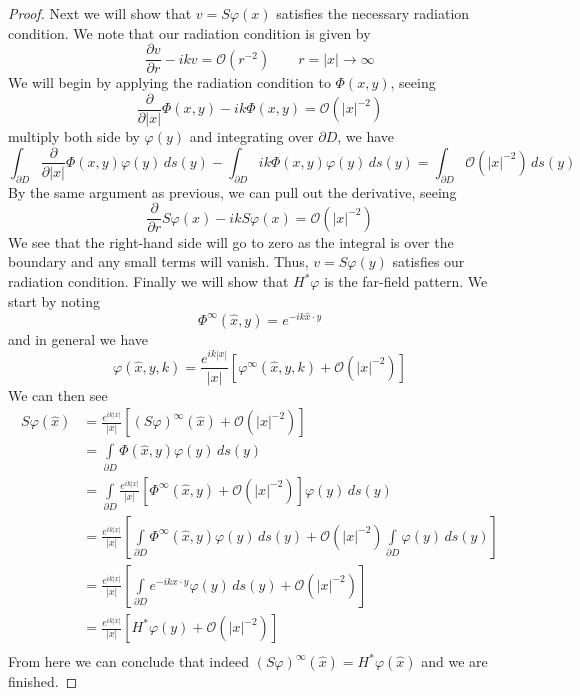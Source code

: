 \documentclass[]{article}
\begin{document}
\begin{proof}
				Next we will show that $v = S\varphi(x)$ satisfies the necessary radiation condition. We note that our radiation condition is given by
				\begin{equation}
					\frac{\partial v}{\partial r} - ikv = \mathcal O(r^{-2}) \qquad r = |x| \to \infty
				\end{equation}
				We will begin by applying the radiation condition to $\Phi (x, y)$, seeing
				\begin{equation}
					\frac{\partial}{\partial |x|}\Phi (x, y) - ik \Phi (x, y) = \mathcal O(|x|^{-2})
				\end{equation}
				multiply both side by $\varphi(y)$ and integrating over $\partial D$, we have
				\begin{equation}
					\int_{\partial D}\frac{\partial}{\partial |x|}\Phi (x, y)\varphi(y)\, ds(y) - \int_{\partial D}ik \Phi (x, y)\varphi(y)\, ds(y) = \int_{\partial D}\mathcal O(|x|^{-2})\, ds(y)
				\end{equation}
				By the same argument as previous, we can pull out the derivative, seeing
				\begin{equation}
					\frac{\partial}{\partial r}S\varphi(x) - ikS\varphi(x) = \mathcal O(|x|^{-2})
				\end{equation}
				We see that the right-hand side will go to zero as the integral is over the boundary and any small terms will vanish. Thus, $v= S\varphi(y)$ satisfies our radiation condition.
				Finally we will show that $H^\ast \varphi$ is the far-field pattern. We start by noting
				\begin{equation}
					\Phi^\infty(\hat x, y) = e^{-ik\hat x\cdot y}
				\end{equation}
				and in general we have
				\begin{equation}
					\varphi(\hat x, y, k) = \frac{e^{ik|x|}}{|x|}\left[ \varphi^\infty(\hat x, y, k) + \mathcal O(|x|^{-2})\right] 
				\end{equation}
				We can then see
				\begin{align}
					S\varphi(\hat x) &= \frac{e^{ik|x|}}{|x|}\left[ (S\varphi)^\infty(\hat x) + \mathcal O(|x|^{-2})\right] \\
					&= \int\limits_{\partial D} \Phi(\hat x, y)\varphi(y)\, ds(y)\\
					&= \int\limits_{\partial D}\frac{e^{ik|x|}}{|x|}\left[ \Phi^\infty(\hat x, y) + \mathcal O(|x|^{-2})\right] \varphi(y)\, ds(y)\\
					&= \frac{e^{ik|x|}}{|x|}\left[ \int\limits_{\partial D} \Phi^\infty(\hat x, y)\varphi(y)\, ds(y) + \mathcal O(|x|^{-2})\int\limits_{\partial D} \varphi(y)\, ds(y)\right] \\
					&= \frac{e^{ik|x|}}{|x|}\left[ \int\limits_{\partial D} e^{-ik\hat x\cdot y}\varphi(y)\, ds(y) + \mathcal O(|x|^{-2})\right] \\
					&= \frac{e^{ik|x|}}{|x|}\left[ H^\ast \varphi(y) + \mathcal O(|x|^{-2})\right] \\
				\end{align}
				From here we can conclude that indeed $	(S\varphi)^\infty(\hat x) =H^\ast \varphi(\hat x)$ and we are finished.
			\end{proof}
\end{document}
